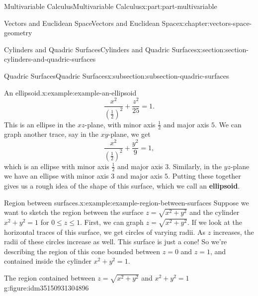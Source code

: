 \documentclass[twoside,10pt,]{book}
\newcommand{\terminology}[1]{\textbf{#1}}
\numberwithin{equation}{part}
\newlength{\qrsize}
\newlength{\previewwidth}
\begin{document}
\begin{partptx}{Multivariable Calculus}{}{Multivariable Calculus}{}{}{x:part:part-multivariable}
\begin{chapterptx}{Vectors and Euclidean Space}{}{Vectors and Euclidean Space}{}{}{x:chapter:vectors-space-geometry}
\begin{sectionptx}{Cylinders and Quadric Surfaces}{}{Cylinders and Quadric Surfaces}{}{}{x:section:section-cylinders-and-quadric-surfaces}
\begin{subsectionptx}{Quadric Surfaces}{}{Quadric Surfaces}{}{}{x:subsection:subsection-quadric-surfaces}
\begin{example}{An ellipsoid.}{x:example:example-an-ellipsoid}
%
\begin{equation*}
\frac{x^{2}}{(\frac{1}{2})^{2}}+\frac{z^{2}}{25} = 1.
\end{equation*}
This is an ellipse in the \(xz\)-plane, with minor axis \(\frac{1}{2}\) and major axis \(5\). We can graph another trace, say in the \(xy\)-plane, we get%
%
\begin{equation*}
\frac{x^{2}}{(\frac{1}{2})^{2}}+\frac{y^{2}}{9} = 1,
\end{equation*}
which is an ellipse with minor axis \(\frac{1}{2}\) and major axis \(3\). Similarly, in the \(yz\)-plane we have an ellipse with minor axis \(3\) and major axis \(5\). Putting these together gives us a rough idea of the shape of this surface, which we call an \terminology{ellipsoid}.%
\end{example}
\begin{example}{Region between surfaces.}{x:example:example-region-between-surfaces}%
Suppose we want to sketch the region between the surface \(z=\sqrt{x^{2}+y^{2}}\) and the cylinder \(x^{2}+y^{2}=1\) for \(0\leq z\leq 1\). First, we can graph \(z=\sqrt{x^{2}+y^{2}}\). If we look at the horizontal traces of this surface, we get circles of varying radii. As \(z\) increases, the radii of these circles increase as well. This surface is just a cone! So we're describing the region of this cone bounded between \(z=0\) and \(z=1\), and contained inside the cylinder \(x^{2}+y^{2}=1\).%
\end{example}
\begin{figureptx}{The region contained between \(z = \sqrt{x^2+y^2}\) and \(x^2+y^2=1\)}{g:figure:idm35150931304896}{}%
\centering
\setlength{\qrsize}{9em}
\setlength{\previewwidth}{\linewidth}
\addtolength{\previewwidth}{-\qrsize}
\begin{tcbraster}[raster columns=2, raster column skip=1pt, raster halign=center, raster force size=false, raster left skip=0pt, raster right skip=0pt]%
\begin{tcolorbox}[previewstyle, width=\previewwidth]%
%

\end{tcolorbox}
\end{tcbraster}
\end{figureptx}
\end{subsectionptx}
\end{sectionptx}
\end{chapterptx}
\end{partptx}
\end{document}
